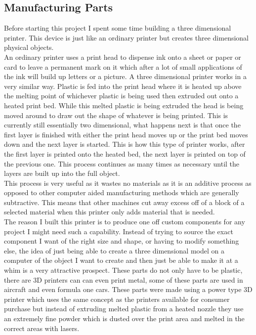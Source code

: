 \subsection{Manufacturing Parts}
Before starting this project I spent some time building a three dimensional printer.  This device is just like an ordinary printer but creates three dimensional physical objects.
\\An ordinary printer uses a print head to dispense ink onto a sheet or paper or card to leave a permanent mark on it which after a lot of small applications of the ink will build up letters or a picture.  A three dimensional printer works in a very similar way.  Plastic is fed into the print head where it is heated up above the melting point of whichever plastic is being used then extruded out onto a heated print bed.  While this melted plastic is being extruded the head is being moved around to draw out the shape of whatever is being printed.  This is currently still essentially two dimensional, what happens next is that once the first layer is finished with either the print head moves up or the print bed moves down and the next layer is started.  This is how this type of printer works, after the first layer is printed onto the heated bed, the next layer is printed on top of the previous one.  This process continues as many times as necessary until the layers are built up into the full object.
\\This process is very useful as it wastes no materials as it is an additive process as opposed to other computer aided manufacturing methods which are generally subtractive.  This means that other machines cut away excess off of a block of a selected material when this printer only adds material that is needed.
\\The reason I built this printer is to produce one off custom components for any project I might need such a capability.  Instead of trying to source the exact component I want of the right size and shape, or having to modify something else, the idea of just being able to create a three dimensional model on a computer of the object I want to create and then just be able to make it at a whim is a very attractive prospect.  These parts do not only have to be plastic, there are 3D printers can can even print metal, some of these parts are used in aircraft\cite{mitprint} and even formula one\cite{f1print} cars.  These parts were made using a power type 3D printer which uses the same concept as the printers available for consumer purchase but instead of extruding melted plastic from a heated nozzle they use an extremely fine powder which is dusted over the print area and melted in the correct areas with lasers.
